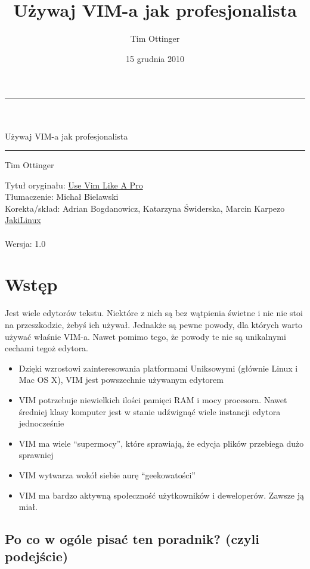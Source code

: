 \documentclass[a4paper,12pt]{article}
\title{Używaj VIM-a jak profesjonalista}
\author{Tim Ottinger}
\date{15 grudnia 2010}
\newcommand{\linia}{\rule{\linewidth}{0.4mm}}
\begin{document}
\pagestyle{empty}
\noindent
\linia \\ \\
{\Huge Używaj VIM-a jak profesjonalista}\\
\linia  
\begin{flushright}
Tim Ottinger
\end{flushright}
\newpage
\noindent
Tytuł oryginału: \href{http://tottinge.blogsome.com/use-vim-like-a-pro}{Use Vim Like A Pro}\\
Tłumaczenie: Michał Bielawski \\
Korekta/skład: Adrian Bogdanowicz, Katarzyna Świderska, Marcin Karpezo\\ 
\href{http://jakilinux.org}{JakiLinux}\\ \\
Wersja: 1.0\newpage
\pagestyle{plain}
\setcounter{page}{3} 
\tableofcontents \newpage
\section{Wstęp}

Jest wiele edytorów tekstu. Niektóre z nich są bez wątpienia świetne i nic nie stoi na przeszkodzie, żebyś ich używał. Jednakże są pewne powody, dla których warto używać właśnie VIM-a. Nawet pomimo tego, że powody te nie są unikalnymi cechami tegoż edytora.
\begin{itemize}
    \item Dzięki wzrostowi zainteresowania platformami Uniksowymi (głównie Linux i Mac OS X), VIM jest powszechnie używanym edytorem
    \item VIM potrzebuje niewielkich ilości pamięci RAM i mocy procesora. Nawet średniej klasy komputer jest w stanie udźwignąć wiele instancji edytora jednocześnie
    \item VIM ma wiele “supermocy”, które sprawiają, że edycja plików przebiega dużo sprawniej
    \item VIM wytwarza wokół siebie aurę “geekowatości”
    \item VIM ma bardzo aktywną społeczność użytkowników i deweloperów. Zawsze ją miał.
\end{itemize}   

\subsection{Po co w ogóle pisać ten poradnik? (czyli podejście)}
\end{document}
